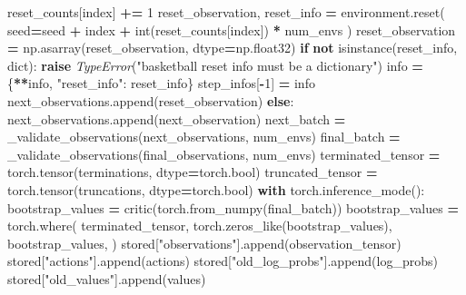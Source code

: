 \documentclass[
  chinese,
  11pt,
  letterpaper,
]{article}
\newenvironment{Shaded}{\begin{snugshade}}{\end{snugshade}}
\newcommand{\BuiltInTok}[1]{#1}
\newcommand{\ControlFlowTok}[1]{\textcolor[rgb]{0.13,0.29,0.53}{\textbf{#1}}}
\newcommand{\DecValTok}[1]{\textcolor[rgb]{0.00,0.00,0.81}{#1}}
\newcommand{\KeywordTok}[1]{\textcolor[rgb]{0.13,0.29,0.53}{\textbf{#1}}}
\newcommand{\NormalTok}[1]{#1}
\newcommand{\OperatorTok}[1]{\textcolor[rgb]{0.81,0.36,0.00}{\textbf{#1}}}
\newcommand{\PreprocessorTok}[1]{\textcolor[rgb]{0.56,0.35,0.01}{\textit{#1}}}
\newcommand{\StringTok}[1]{\textcolor[rgb]{0.31,0.60,0.02}{#1}}
\renewenvironment{Shaded}{\par\smallskip}{\par\smallskip}
\begin{document}
\begin{Shaded}
\begin{Highlighting}[]
\NormalTok{                reset\_counts[index] }\OperatorTok{+=} \DecValTok{1}
\NormalTok{                reset\_observation, reset\_info }\OperatorTok{=}\NormalTok{ environment.reset(}
\NormalTok{                    seed}\OperatorTok{=}\NormalTok{seed }\OperatorTok{+}\NormalTok{ index }\OperatorTok{+} \BuiltInTok{int}\NormalTok{(reset\_counts[index]) }\OperatorTok{*}\NormalTok{ num\_envs}
\NormalTok{                )}
\NormalTok{                reset\_observation }\OperatorTok{=}\NormalTok{ np.asarray(reset\_observation, dtype}\OperatorTok{=}\NormalTok{np.float32)}
                \ControlFlowTok{if} \KeywordTok{not} \BuiltInTok{isinstance}\NormalTok{(reset\_info, }\BuiltInTok{dict}\NormalTok{):}
                    \ControlFlowTok{raise} \PreprocessorTok{TypeError}\NormalTok{(}\StringTok{"basketball reset info must be a dictionary"}\NormalTok{)}
\NormalTok{                info }\OperatorTok{=}\NormalTok{ \{}\OperatorTok{**}\NormalTok{info, }\StringTok{"reset\_info"}\NormalTok{: reset\_info\}}
\NormalTok{                step\_infos[}\OperatorTok{{-}}\DecValTok{1}\NormalTok{] }\OperatorTok{=}\NormalTok{ info}
\NormalTok{                next\_observations.append(reset\_observation)}
            \ControlFlowTok{else}\NormalTok{:}
\NormalTok{                next\_observations.append(next\_observation)}
\NormalTok{        next\_batch }\OperatorTok{=}\NormalTok{ \_validate\_observations(next\_observations, num\_envs)}
\NormalTok{        final\_batch }\OperatorTok{=}\NormalTok{ \_validate\_observations(final\_observations, num\_envs)}
\NormalTok{        terminated\_tensor }\OperatorTok{=}\NormalTok{ torch.tensor(terminations, dtype}\OperatorTok{=}\NormalTok{torch.}\BuiltInTok{bool}\NormalTok{)}
\NormalTok{        truncated\_tensor }\OperatorTok{=}\NormalTok{ torch.tensor(truncations, dtype}\OperatorTok{=}\NormalTok{torch.}\BuiltInTok{bool}\NormalTok{)}
        \ControlFlowTok{with}\NormalTok{ torch.inference\_mode():}
\NormalTok{            bootstrap\_values }\OperatorTok{=}\NormalTok{ critic(torch.from\_numpy(final\_batch))}
\NormalTok{            bootstrap\_values }\OperatorTok{=}\NormalTok{ torch.where(}
\NormalTok{                terminated\_tensor,}
\NormalTok{                torch.zeros\_like(bootstrap\_values),}
\NormalTok{                bootstrap\_values,}
\NormalTok{            )}
\NormalTok{        stored[}\StringTok{"observations"}\NormalTok{].append(observation\_tensor)}
\NormalTok{        stored[}\StringTok{"actions"}\NormalTok{].append(actions)}
\NormalTok{        stored[}\StringTok{"old\_log\_probs"}\NormalTok{].append(log\_probs)}
\NormalTok{        stored[}\StringTok{"old\_values"}\NormalTok{].append(values)}

\end{Highlighting}
\end{Shaded}
\end{document}
